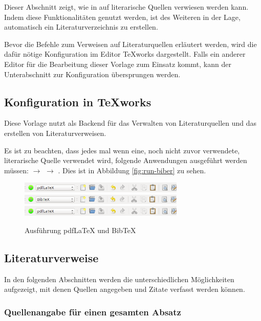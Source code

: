 Dieser Abschnitt zeigt, wie in \latex auf literarische Quellen verwiesen werden kann. Indem diese Funktionalitäten genutzt werden, ist \latex des Weiteren in der Lage, automatisch ein Literaturverzeichnis zu erstellen.

Bevor die Befehle zum Verweisen auf Literaturquellen erläutert werden, wird die dafür nötige Konfiguration im Editor TeXworks dargestellt. Falls ein anderer Editor für die Bearbeitung dieser Vorlage zum Einsatz kommt, kann der Unterabschnitt zur Konfiguration übersprungen werden.


\subsection{Konfiguration in TeXworks}

Diese Vorlage nutzt  als Backend für das Verwalten von Literaturquellen und das erstellen von Literaturverweisen.

Es ist zu beachten, dass jedes mal wenn eine, noch nicht zuvor verwendete, literarische Quelle verwendet wird, folgende Anwendungen ausgeführt werden müssen:  $\rightarrow$  $\rightarrow$ . Dies ist in Abbildung \vref{fig:run-biber} zu sehen.

\begin{figure}
	\centering
	\includegraphics[width=0.7\textwidth]{bilder/run-biber-01.png}
	\includegraphics[width=0.7\textwidth]{bilder/run-biber-02.png}
	\includegraphics[width=0.7\textwidth]{bilder/run-biber-01.png}
	\caption{Ausführung pdfLaTeX und BibTeX}
	\label{fig:run-biber}
\end{figure}


\subsection{Literaturverweise}

In den folgenden Abschnitten werden die unterschiedlichen Möglichkeiten aufgezeigt, mit denen Quellen angegeben und Zitate verfasst werden können.


\subsubsection{Quellenangabe für einen gesamten Absatz}

